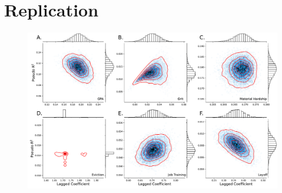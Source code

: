 \documentclass[12pt]{beamer}
\begin{document}
\section{Replication}
\begin{frame}
\begin{center}
\begin{figure}
\includegraphics[width=.925\linewidth]{../../figures//ffc_seeds.pdf} \\ \vspace{.025in}
\end{figure}
\end{center}
\end{frame}
\end{document}
